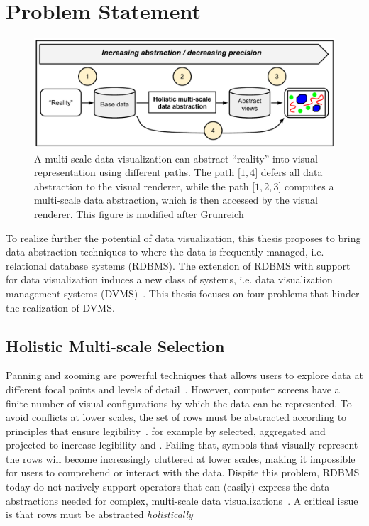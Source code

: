 \section{Problem Statement}
\label{sec:introduction:problem:statement}

\begin{figure}[htbp]
\begin{center}
\includegraphics[scale=.6]{figs-thesis/holistic-abstraction-pipeline.pdf}
\caption{A multi-scale data visualization can abstract ``reality'' into visual representation using different paths. The path $\lbrack1,4 \rbrack$ defers all data abstraction to the visual renderer, while the path $\lbrack 1,2,3 \rbrack$ computes a multi-scale data abstraction, which is then accessed by the visual renderer. This figure is modified after Grunreich~\cite{gruenreich1985cag}}
\label{fig:related:work:data:abstraction}
\end{center}
\end{figure}

To realize further the potential of data visualization, this thesis proposes to bring data abstraction techniques to where the data is frequently managed, i.e. relational database systems (RDBMS). The extension of RDBMS with support for data visualization induces a new class of systems, i.e. data visualization management systems (DVMS)~\cite{wu2014case}. This thesis focuses on four problems that hinder the realization of DVMS.

\subsection{Holistic Multi-scale Selection}
Panning and zooming are powerful techniques that allows users to explore data at different focal points and levels of detail~\cite{stolte2003multiscale,woodruff2001datasplash}. However, computer screens have a finite number of visual configurations by which the data can be represented. To avoid conflicts at lower scales, the set of rows must be abstracted according to principles that ensure legibility~\cite{woodruff1998constant, topfer1966principles}.  for example by selected, aggregated and projected to increase legibility and . Failing that, symbols that visually represent the rows will become increasingly cluttered at lower scales, making it impossible for users to comprehend or interact with the data. Dispite this problem, RDBMS today do not natively support operators that can (easily) express the data abstractions needed for complex, multi-scale data visualizations~\cite{wu2014case}. A critical issue is that rows must be abstracted \emph{holistically}

